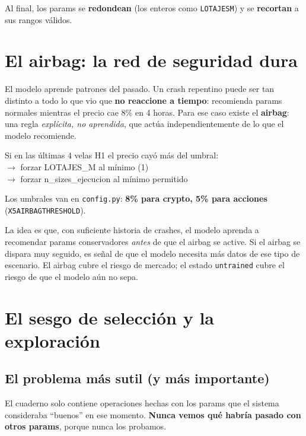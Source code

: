 \documentclass[11pt,a4paper]{report}
\newcommand{\code}[1]{\texttt{\def\_{\textunderscore\allowbreak}#1}}
\begin{document}
Al final, los params se \textbf{redondean} (los enteros como \code{LOTAJES\_M}) y se
\textbf{recortan} a sus rangos válidos.

\chapter{El airbag: la red de seguridad dura}

El modelo aprende patrones del pasado. Un crash repentino puede ser tan distinto a todo lo que
vio que \textbf{no reaccione a tiempo}: recomienda params normales mientras el precio cae 8\% en
4 horas. Para ese caso existe el \textbf{airbag}: una regla \emph{explícita, no aprendida}, que
actúa independientemente de lo que el modelo recomiende.

\begin{center}\small\ttfamily
Si en las últimas 4 velas H1 el precio cayó más del umbral:\\
$\rightarrow$ forzar LOTAJES\_M al mínimo (1)\\
$\rightarrow$ forzar n\_sizes\_ejecucion al mínimo permitido
\end{center}

Los umbrales van en \code{config.py}: \textbf{8\% para crypto, 5\% para acciones}
(\code{X5\_AIRBAG\_THRESHOLD}).

\begin{nota}
La idea es que, con suficiente historia de crashes, el modelo aprenda a recomendar params
conservadores \emph{antes} de que el airbag se active. Si el airbag se dispara muy seguido, es
señal de que el modelo necesita más datos de ese tipo de escenario. El airbag cubre el riesgo de
mercado; el estado \code{untrained} cubre el riesgo de que el modelo aún no sepa.
\end{nota}

\chapter{El sesgo de selección y la exploración}

\section{El problema más sutil (y más importante)}

El cuaderno solo contiene operaciones hechas con los params que el sistema consideraba ``buenos''
en ese momento. \textbf{Nunca vemos qué habría pasado con otros params}, porque nunca los
probamos.
\end{document}
